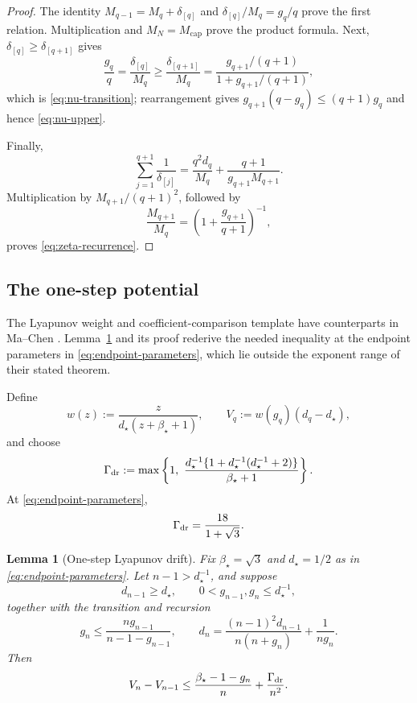\documentclass[11pt]{article}
\newtheorem{lemma}[theorem]{Lemma}
\theoremstyle{definition}
\theoremstyle{remark}
\newcommand{\rankmass}{M}
\newcommand{\rankdens}{d}
\newcommand{\rankgain}{g}
\newcommand{\criticalexp}{\beta_{\star}}
\newcommand{\threshold}{d_{\star}}
\begin{document}
\begin{proof}
The identity
\(\rankmass_{q-1}=\rankmass_q+\delta_{[q]}\) and
\(\delta_{[q]}/\rankmass_q=\rankgain_q/q\) prove the first relation.
Multiplication and
\(\rankmass_N=\rankmass_{\mathrm{cap}}\) prove the product formula.  Next,
\(\delta_{[q]}\ge\delta_{[q+1]}\) gives
\[
 \frac{\rankgain_q}{q}
 =\frac{\delta_{[q]}}{\rankmass_q}
 \ge\frac{\delta_{[q+1]}}{\rankmass_q}
 =\frac{\rankgain_{q+1}/(q+1)}
        {1+\rankgain_{q+1}/(q+1)},
\]
which is \eqref{eq:nu-transition}; rearrangement gives
\(\rankgain_{q+1}(q-\rankgain_q)\le(q+1)\rankgain_q\) and hence
\eqref{eq:nu-upper}.

Finally,
\[
 \sum_{j=1}^{q+1}\frac1{\delta_{[j]}}
 =\frac{q^2\rankdens_q}{\rankmass_q}
  +\frac{q+1}{\rankgain_{q+1}\rankmass_{q+1}}.
\]
Multiplication by \(\rankmass_{q+1}/(q+1)^2\), followed by
\[
 \frac{\rankmass_{q+1}}{\rankmass_q}
 =\left(1+\frac{\rankgain_{q+1}}{q+1}\right)^{-1},
\]
proves \eqref{eq:zeta-recurrence}.
\end{proof}

\subsection{The one-step potential}

The Lyapunov weight and coefficient-comparison template have counterparts in
Ma--Chen \cite[Lemma~6.3 and Appendix~B.3]{machen2026}.  Lemma~\ref{lem:drift}
and its proof rederive the needed inequality at the endpoint parameters in
\eqref{eq:endpoint-parameters}, which lie outside the exponent range of their
stated theorem.

Define
\begin{equation}
 w(z)
 :=\frac{z}{\threshold(z+\criticalexp+1)},
 \qquad
 V_q
 :=w(\rankgain_q)(\rankdens_q-\threshold),
 \label{eq:potential}
\end{equation}
and choose
\begin{equation}
 \Gamma_{\rm dr}
 :=
 \max\left\{
 1,\
 \frac{\threshold^{-1}
       \{1+\threshold^{-1}(\threshold^{-1}+2)\}}
      {\criticalexp+1}
 \right\}.
 \label{eq:Cdr}
\end{equation}
At \eqref{eq:endpoint-parameters},
\[
 \Gamma_{\rm dr}=\frac{18}{1+\sqrt3}.
\]

\begin{lemma}[One-step Lyapunov drift]
\label{lem:drift}
Fix \(\criticalexp=\sqrt3\) and \(\threshold=1/2\) as in
\eqref{eq:endpoint-parameters}.  Let
\(n-1>\threshold^{-1}\), and suppose
\[
 \rankdens_{n-1}\ge\threshold,\qquad
 0<\rankgain_{n-1},\rankgain_n\le\threshold^{-1},
\]
together with the transition and recursion
\[
 \rankgain_n\le
 \frac{n\rankgain_{n-1}}{n-1-\rankgain_{n-1}},
 \qquad
 \rankdens_n
 =\frac{(n-1)^2\rankdens_{n-1}}{n(n+\rankgain_n)}
  +\frac1{n\rankgain_n}.
\]
Then
\begin{equation}
 V_n-V_{n-1}
 \le\frac{\criticalexp-1-\rankgain_n}{n}
    +\frac{\Gamma_{\rm dr}}{n^2}.
 \label{eq:drift}
\end{equation}
\end{lemma}
\end{document}
